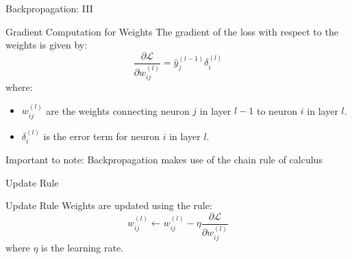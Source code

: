 \documentclass[aspectratio=169]{../latex_main/tntbeamer}  %
\begin{document}
        \begin{frame}{Backpropagation: III}

        \vspace{-2em}
        \begin{block}{Gradient Computation for Weights}
        The gradient of the loss with respect to the weights is given by:
        \[
        \frac{\partial \mathcal{L}}{\partial w_{ij}^{(l)}} = \hat{y}_j^{(l-1)} \delta_i^{(l)}
        \]
        where:
        \begin{itemize}
            \item \( w_{ij}^{(l)} \) are the weights connecting neuron \( j \) in layer \( l-1 \) to neuron \( i \) in layer \( l \).
            \item \( \delta_i^{(l)} \) is the error term for neuron \( i \) in layer \( l \).
        \end{itemize}
        \end{block}

        Important to note: Backpropagation makes use of the chain rule of calculus
        
        \end{frame}
        \begin{frame}{Update Rule}

        \begin{block}{Update Rule}
            Weights are updated using the rule:
            \[
            w_{ij}^{(l)} \leftarrow w_{ij}^{(l)} - \eta \frac{\partial \mathcal{L}}{\partial w_{ij}^{(l)}}
            \]
            where \( \eta \) is the learning rate.
         \end{block}
            
        \end{frame}
\end{document}
